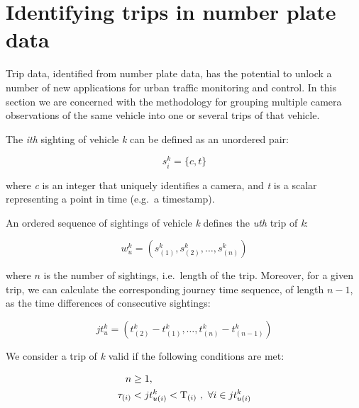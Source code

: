 \section{Identifying trips in number plate data}

Trip data, identified from number plate data, has the potential to unlock a number of new applications for urban traffic monitoring and control. In this section we are concerned with the methodology for grouping multiple camera observations of the same vehicle into one or several trips of that vehicle.

The \emph{ith} sighting of vehicle \emph{k} can be defined as an unordered pair:

\begin{equation} \label{e.sighting}
s^{k}_{i} = \{ c, t \}
\end{equation}

where \emph{c} is an integer that uniquely identifies a camera, and \emph{t} is a scalar representing a point in time (e.g.\ a timestamp).

An ordered sequence of sightings of vehicle \emph{k} defines the \emph{uth} trip of \emph{k}:

\begin{equation} \label{e.trip}
w^{k}_{u} = \left(s^{k}_{(1)}, s^{k}_{(2)}, \dots , s^{k}_{(n)}\right)
\end{equation}

where \( n \) is the number of sightings, i.e.\ length of the trip. Moreover, for a given trip, we can calculate the corresponding journey time sequence, of length \(n-1\), as the time differences of consecutive sightings:

\begin{equation} \label{e.journeytime}
jt^{k}_{u} = \left(t^{k}_{(2)} - t^{k}_{(1)}, \ldots, t^{k}_{(n)} - t^{k}_{(n-1)} \right)
\end{equation}

We consider a trip of \emph{k} valid if the following conditions are met:

\begin{align}
n &\ge 1 , \label{e.trip.constraints.1} \\
\tau_{(i)} &< jt^{k}_{u(i)} < \mathrm{T}_{(i)} \ , \ \forall i \in jt^{k}_{u(i)} \label{e.trip.constraints.2}
\end{align}

